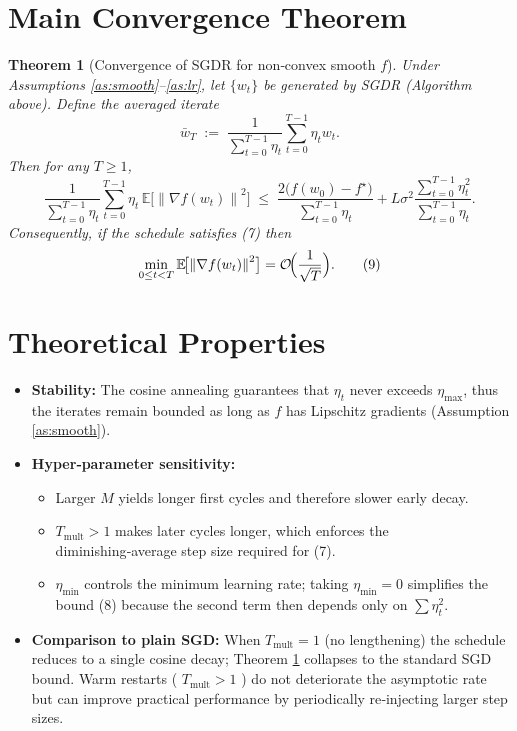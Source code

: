 \documentclass{article}
\newtheorem{theorem}{Theorem}
\newcommand{\E}{\mathbb{E}}
\newcommand{\norm}[1]{\left\lVert#1\right\rVert}
\begin{document}
\section*{Main Convergence Theorem}
\begin{theorem}[Convergence of SGDR for non‑convex smooth $f$]\label{thm:sgdr}
Under Assumptions \ref{as:smooth}–\ref{as:lr}, let $\{w_{t}\}$ be generated by
SGDR (Algorithm above). Define the averaged iterate
\[
\bar{w}_{T}\;:=\;\frac{1}{\sum_{t=0}^{T-1}\eta_{t}}\sum_{t=0}^{T-1}\eta_{t}w_{t}.
\]
Then for any $T\ge 1$,
\[
\frac{1}{\sum_{t=0}^{T-1}\eta_{t}}
      \sum_{t=0}^{T-1}\eta_{t}\,
      \E\!\bigl[\norm{\nabla f(w_{t})}^{2}\bigr]
   \;\le\;
   \frac{2\bigl(f(w_{0})-f^{\star}\bigr)}{\sum_{t=0}^{T-1}\eta_{t}}
   +L\sigma^{2}\frac{\sum_{t=0}^{T-1}\eta_{t}^{2}}{\sum_{t=0}^{T-1}\eta_{t}} .
   \tag{8}
\]
Consequently, if the schedule satisfies (7) then
\[
\min_{0\le t<T}\E\!\bigl[\norm{\nabla f(w_{t})}^{2}\bigr]
   =\mathcal{O}\!\Bigl(\frac{1}{\sqrt{T}}\Bigr).                     \tag{9}
\]
\end{theorem}

\section*{Theoretical Properties}
\begin{itemize}
\item \textbf{Stability:} The cosine annealing guarantees that $\eta_{t}$ never
exceeds $\eta_{\max}$, thus the iterates remain bounded as long as $f$ has
Lipschitz gradients (Assumption \ref{as:smooth}).
\item \textbf{Hyper‑parameter sensitivity:}
  \begin{itemize}
    \item Larger $M$ yields longer first cycles and therefore slower early
          decay.
    \item $T_{\text{mult}}>1$ makes later cycles longer, which enforces the
          diminishing‑average step size required for (7).
    \item $\eta_{\min}$ controls the minimum learning rate; taking $\eta_{\min}=0$
          simplifies the bound (8) because the second term then depends only on
          $\sum\eta_{t}^{2}$.
  \end{itemize}
\item \textbf{Comparison to plain SGD:} When $T_{\text{mult}}=1$ (no lengthening)
      the schedule reduces to a single cosine decay; Theorem \ref{thm:sgdr}
      collapses to the standard SGD bound. Warm restarts ( $T_{\text{mult}}>1$ )
      do not deteriorate the asymptotic rate but can improve practical
      performance by periodically re‑injecting larger step sizes.
\end{itemize}
\end{document}
